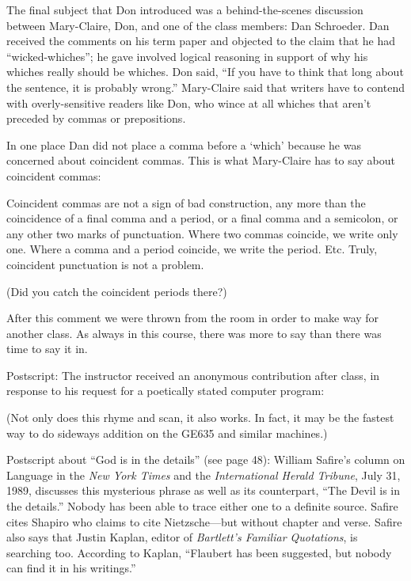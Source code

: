 The final subject that Don introduced was a 
behind-the-scenes discussion between
Mary-Claire, Don, and one of the class members: Dan Schroeder.  Dan
received the comments on his term paper and objected to the claim that he
had ``wicked-whiches''; he gave involved logical reasoning in support of
why his whiches really should be whiches.  Don said, ``If you have to think
that long about the sentence, it is probably wrong.''
Mary-Claire said that writers have to contend with overly-sensitive
readers like Don, who wince at  all whiches that aren't preceded
by commas or prepositions.

In one place Dan did not place a comma before a `which' because he was
concerned about coincident commas.  This is what Mary-Claire has to say
about coincident commas:

{\narrower\smallskip\noindent
   Coincident commas are not a sign of bad construction, any more than
   the coincidence of a final comma and a period, or a final comma and
   a semicolon, or any other two marks of punctuation.  Where two commas
   coincide, we write only one.  Where a comma and a period coincide,
   we write the period.  Etc.  Truly, coincident punctuation is not a
   problem.
\smallskip}

(Did you catch the coincident periods there?)

After this comment we were thrown from the room in order to make way for
another class.  As always in this course, there was more to say than there
was time to say it in.

\medskip
Postscript: The instructor received an anonymous contribution after class,
in response to his request for a poetically stated computer program:


(Not only does this rhyme and scan, it also works. In fact, it may be
the fastest way to do sideways addition on the GE635 and similar machines.)

\vfill\eject
Postscript about ``God is in the details'' (see page 48):
William Safire's column on Language in the {\sl New York Times\/} and the
{\sl International Herald Tribune}, July 31, 1989, discusses this mysterious
phrase as well as its counterpart, ``The Devil is in the details.'' Nobody
has been able to trace either one to a definite source. Safire cites
Shapiro who claims to cite Nietzsche---but without chapter and verse.
Safire also says that Justin Kaplan, editor of {\sl Bartlett's Familiar
Quotations}, is searching too. According to Kaplan, ``Flaubert has been
suggested, but nobody can find it in his writings.''

